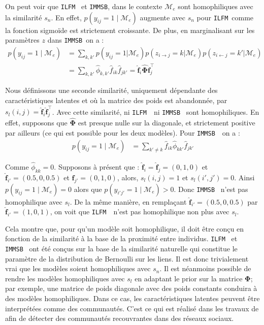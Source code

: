 \documentclass[french]{hermes-journal}
\newcommand{\ilfm}{\texttt{ILFM}}
\newcommand{\immsb}{\texttt{IMMSB}}
\newcommand{\pr}{p}
\newcommand{\M}{\mathcal{M}}
\newcommand{\mat}[1]{\bm{#1}}
\begin{document}
On peut voir que \ilfm~  et \immsb, dans le contexte $\mathcal{M}_e$ sont homophiliques avec la similarité $s_n$. En effet, $\pr(y_{ij}=1 \mid \mathcal{M}_e)$ augmente avec $s_n$  pour  \ilfm\ comme la fonction sigmoïde est strictement croissante. De plus, en marginalisant sur les paramètres $z$ dans \immsb\ on a :
\begin{align}
    \pr(y_{ij} =1 \mid \mathcal{M}_e) & = \sum_{k,k'} \pr(y_{ij}=1|\mathcal{M}_e) \pr(z_{i \rightarrow j}=k | \mathcal{M}_e) \pr(z_{i \leftarrow j}=k' | \mathcal{M}_e) \nonumber \\
& = \sum_{k,k'} \hat{\phi}_{k,k'} \hat{f}_{ik} \hat{f}_{jk'} = \mat{\hat{f}}_{i} \mat{\hat{\Phi}} \mat{\hat{f}}_j^\top \nonumber
\end{align}


Nous définissons une seconde similarité, uniquement dépendante des caractéristiques latentes et où la matrice des poids est abandonnée, par $s_l(i,j) = \mat{\hat{f}}_{i} \mat{\hat{f}}_j^\top$. Avec cette similarité, ni \ilfm~ ni \immsb~ sont homophiliques. En effet, supposons que $\mat{\hat{\Phi}}$ est presque nulle sur la diagonale, et strictement positive par ailleurs (ce qui est possible pour les deux modèles). Pour \immsb~ on a :
\begin{align*} 
\pr(y_{ij}=1 \mid \M_e) & = \sum_{k' \neq k} \hat{f}_{ik} \hat{\phi}_{kk'} \hat{f}_{jk'}
\end{align*}


Comme $\hat{\phi}_{kk} = 0$.  Supposons à présent que : $\mat{\hat{f}}_i=\mat{\hat{f}}_j=(0,1,0)$ et $\mat{\hat{f}}_{i'}=(0.5,0,0.5)$ et $\mat{\hat{f}}_{j'}=(0,1,0)$, alors, $s_l(i,j)=1$ et $s_l(i',j')=0$. Ainsi $\pr(y_{ij}=1 \mid \M_e) = 0$ alors que $\pr(y_{i'j'}=1 \mid \M_e) > 0$. Donc \immsb~ n'est pas homophilique avec $s_l$. De la même manière, en remplaçant $\mat{\hat{f}}_{i'}=(0.5,0,0. 5)$ par $\mat{\hat{f}}_{i'}=(1,0,1)$, on voit que \ilfm~ n'est pas homophilique non plus avec $s_l$.

Cela montre que, pour qu'un modèle soit homophilique, il doit être conçu en fonction de la similarité à la base de la proximité entre individus. \ilfm~ et \immsb~ ont été conçus sur la base de la similarité naturelle qui constitue le paramètre de la distribution de Bernoulli sur les liens. Il est donc trivialement vrai que les modèles soient homophiliques avec $s_n$. Il est néanmoins possible de rendre les modèles homophiliques avec $s_l$ en adaptant le prior sur la matrice $\mat{\Phi}$; par exemple, une matrice de poids diagonale avec des poids constants conduira à des modèles homophiliques. Dans ce cas, les caractéristiques latentes peuvent être interprétées comme des communautés. C'est ce qui est réalisé dans les travaux de \cite{AMMSB} afin de détecter des communautés recouvrantes dans des réseaux sociaux.
\end{document}
